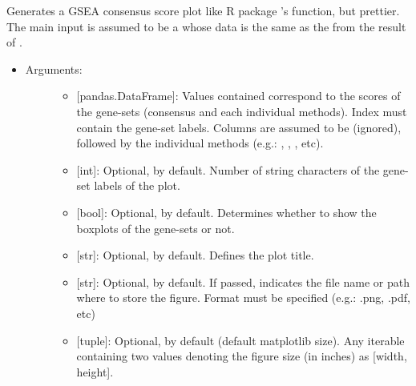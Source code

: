 \documentclass[letterpaper,10pt,english]{sphinxmanual}
\begin{document}

\begin{fulllineitems}
\label{\detokenize{plots:data_tools.plots.piano_consensus}}
Generates a GSEA consensus score plot like R package ’s
 function, but prettier.
The main input is assumed to be a  whose data
is the same as the  from the result of
.
\begin{itemize}
\item {} \begin{description}
\item[{Arguments:}] \leavevmode\begin{itemize}
\item {} 
 {[}pandas.DataFrame{]}: Values contained correspond to the
scores of the gene-sets (consensus and each individual
methods). Index must contain the gene-set labels. Columns are
assumed to be  (ignored),  followed
by the individual methods (e.g.: , ,
, etc).

\item {} 
 {[}int{]}: Optional,  by default. Number of string
characters of the gene-set labels of the plot.

\item {} 
 {[}bool{]}: Optional,  by default. Determines
whether to show the boxplots of the gene-sets or not.

\item {} 
 {[}str{]}: Optional,  by default. Defines the plot
title.

\item {} 
 {[}str{]}: Optional,  by default. If passed,
indicates the file name or path where to store the figure.
Format must be specified (e.g.: .png, .pdf, etc)

\item {} 
 {[}tuple{]}: Optional,  by default (default
matplotlib size). Any iterable containing two values denoting
the figure size (in inches) as {[}width, height{]}.


\end{itemize}
\end{description}
\end{itemize}
\end{fulllineitems}
\end{document}
